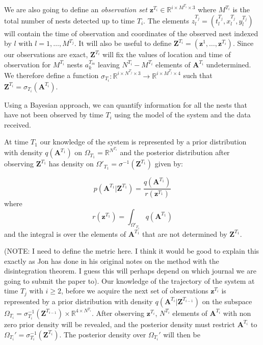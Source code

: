 \documentclass[11pt,a4paper]{article}
\renewcommand{\vec}[1]{\mathbf{#1}}
\begin{document}
We are also going to define an \textit{observation set} $\vec{z}^{T_i} \in \mathbb{R}^{i \times M^{T_i} \times 3}$ where $M^{T_i}$ is the total number of nests detected up to time $T_i$. The elements $z^{T_j}_l = (t^{T_j}_l, x^{T_j}_l, y^{T_j}_l)$ will contain the time of observation and coordinates of the observed nest indexed by $l$ with $l = 1, \dots, M^{T_j}$. It will also be useful to define $\vec{Z}^{T_i} = (\vec{z}^1, \dots, \vec{z}^{T_i})$. Since our observations are exact, $\vec{Z}^{T_i}$ will fix the values of location and time of observation for $M^{T_i}$ nests $a^{T_m}_k$ leaving $N^{T_i}-M^{T_i}$ elements of $\vec{A}^{T_i}$ undetermined. We therefore define a function $\sigma_{T_i}: \mathbb{R}^{i\times N^{T_j}\times 3} \rightarrow \mathbb{R}^{i\times M^{T_j}\times 4}$ such that $\vec{Z}^{T_i} = \sigma_{T_i}(\vec{A}^{T_i})$.

Using a Bayesian approach, we can quantify information for all the nests that have not been observed by time $T_i$ using the model of the system and the data received.

At time $T_1$ our knowledge of the system is represented by a prior distribution with density $q(\vec{A}^{T_1})$ on $\Omega_{T_1} = \mathbb{R}^{N^{T_1}}$ and the posterior distribution after observing $\vec{Z}^{T_1}$ has density on $\Omega'_{T_1} = \sigma^{-1}(\vec{Z}^{T_1})$ given by:

\begin{equation*}
    p(\vec{A}^{T_1} | \vec{Z}^{T_1}) = \frac{q(\vec{A}^{T_1})}{r(\vec{z}^{T_1})}
\end{equation*}
where
\begin{equation*}
    r(\vec{z}^{T_1}) = \int_{\Omega'_{T_1}} q(\vec{A}^{T_1}) 
\end{equation*}
and the integral is over the elements of $\vec{A}^{T_1}$ that are not determined by $\vec{Z}^{T_1}$.

(NOTE: I need to define the metric here. I think it would be good to explain this exactly as Jon has done in his original notes on the method with the disintegration theorem. I guess this will perhaps depend on which journal we are going to submit the paper to).
Our knowledge of the trajectory of the system at time $T_j$ with $i \geq 2$, before we acquire the next set of observations $\vec{z}^{T_i}$ is represented by a prior distribution with density $q(\vec{A}^{T_i} | \vec{Z}^{T_{i-1}})$ on the subspace $\Omega_{T_i} = \sigma_{T_i}^{-1} (\vec{Z}^{T_{i-1}}) \times \mathbb{R}^{4 \times N^{T_i}}$. After observing $\vec{z}^{T_i}$, $N^{T_i}$ elements of $\vec{A}^{T_i}$ with non zero prior density will be revealed, and the posterior density must restrict $\vec{A}^{T_i}$ to $\Omega_{T_i}' = \sigma_{T_i}^{-1}(\vec{Z}^{T_i})$. The posterior density over $\Omega_{T_i}'$ will then be
\end{document}
